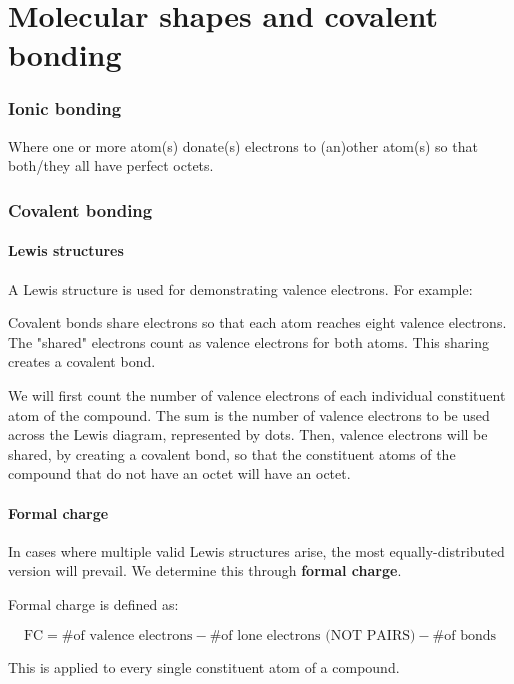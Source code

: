 \documentclass[letterpaper, 12pt]{article}
\begin{document}
\clearpage

\part{Molecular shapes and covalent bonding}

\section{Ionic bonding}
Where one or more atom(s) donate(s) electrons to (an)other atom(s) so that both/they all have perfect octets.

\section{Covalent bonding}

	\subsection{Lewis structures}
	A Lewis structure is used for demonstrating valence electrons. For example:


	Covalent bonds share electrons so that each atom reaches eight valence electrons. The "shared" electrons count as valence electrons for both atoms. This sharing creates a covalent bond.

	We will first count the number of valence electrons of each individual constituent atom of the compound. The sum is the number of valence electrons to be used across the Lewis diagram, represented by dots. Then, valence electrons will be shared, by creating a covalent bond, so that the constituent atoms of the compound that do not have an octet will have an octet.

	\subsection{Formal charge}
	In cases where multiple valid Lewis structures arise, the most equally-distributed version will prevail. We determine this through \textbf{formal charge}.
	
	Formal charge is defined as:
	
	$$\text{FC} = \text{\# of valence electrons} - \text{\# of lone electrons (NOT PAIRS)} - \text{\# of bonds}$$
	
	This is applied to every single constituent atom of a compound.
	
\end{document}
